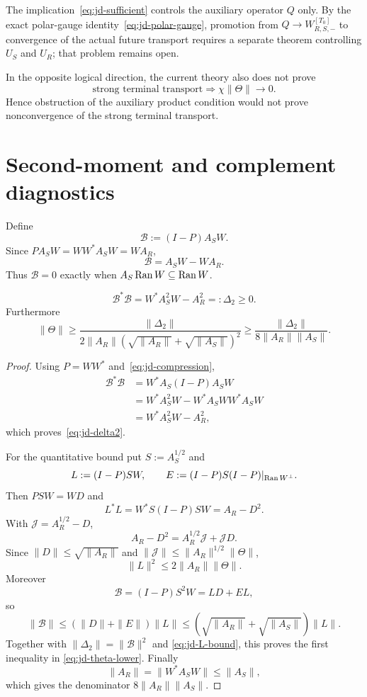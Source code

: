 \begin{remark}\label{rem:product}
The implication~\eqref{eq:jd-sufficient} controls the auxiliary operator $Q$ only.
By the exact polar-gauge identity~\eqref{eq:jd-polar-gauge}, promotion from
$Q\to W_{R,S,-}^{[T_0]}$ to convergence of the actual future transport requires a
separate theorem controlling $U_S$ and $U_R$; that problem remains open.

In the opposite logical direction, the current theory also does not prove
\[
 \text{strong terminal transport}
 \Longrightarrow
 \chi\|\Theta\|\to0.
\]
Hence obstruction of the auxiliary product condition would not prove nonconvergence of
the strong terminal transport.
\end{remark}

\section{Second-moment and complement diagnostics}\label{sec:diagnostic}

Define
\[
 \mathscr B:=(I-P)A_SW.
\tag{JD.12}\label{eq:jd-B}
\]
Since $PA_SW=WW^*A_SW=WA_R$,
\[
 \mathscr B=A_SW-WA_R.
\tag{JD.13}\label{eq:jd-B-intertwining}
\]
Thus $\mathscr B=0$ exactly when $A_S\operatorname{Ran} W\subseteq\operatorname{Ran} W$.

\begin{proposition}\label{prop:second}
\[
 \boxed{
 \mathscr B^*\mathscr B
 =W^*A_S^2W-A_R^2
 =:\Delta_2\ge0.
 }
\tag{JD.14}\label{eq:jd-delta2}
\]
Furthermore
\[
 \boxed{
 \|\Theta\|
 \ge
 \frac{\|\Delta_2\|}
 {2\|A_R\|(\sqrt{\|A_R\|}+\sqrt{\|A_S\|})^2}
 \ge
 \frac{\|\Delta_2\|}{8\|A_R\|\|A_S\|}.
 }
\tag{JD.15}\label{eq:jd-theta-lower}
\]
\end{proposition}

\begin{proof}
Using $P=WW^*$ and~\eqref{eq:jd-compression},
\[
\begin{aligned}
 \mathscr B^*\mathscr B
 &=W^*A_S(I-P)A_SW\\
 &=W^*A_S^2W-W^*A_SWW^*A_SW\\
 &=W^*A_S^2W-A_R^2,
\end{aligned}
\]
which proves~\eqref{eq:jd-delta2}.

For the quantitative bound put $S:=A_S^{1/2}$ and
\[
 L:=(I-P)SW,
 \qquad
 E:=(I-P)S(I-P)|_{\operatorname{Ran} W^\perp}.
\]
Then $PSW=WD$ and
\[
 L^*L
 =W^*S(I-P)SW
 =A_R-D^2.
\]
With $\mathscr J=A_R^{1/2}-D$,
\[
 A_R-D^2=A_R^{1/2}\mathscr J+\mathscr JD.
\]
Since $\|D\|\le\sqrt{\|A_R\|}$ and
$\|\mathscr J\|\le\|A_R\|^{1/2}\|\Theta\|$,
\[
 \|L\|^2\le2\|A_R\|\|\Theta\|.
\tag{JD.16}\label{eq:jd-L-bound}
\]
Moreover
\[
 \mathscr B=(I-P)S^2W=LD+EL,
\]
so
\[
 \|\mathscr B\|
 \le(\|D\|+\|E\|)\|L\|
 \le(\sqrt{\|A_R\|}+\sqrt{\|A_S\|})\|L\|.
\]
Together with $\|\Delta_2\|=\|\mathscr B\|^2$ and
\eqref{eq:jd-L-bound}, this proves the first inequality in
\eqref{eq:jd-theta-lower}.  Finally
\[
 \|A_R\|=\|W^*A_SW\|\le\|A_S\|,
\]
which gives the denominator $8\|A_R\|\|A_S\|$.
\end{proof}

